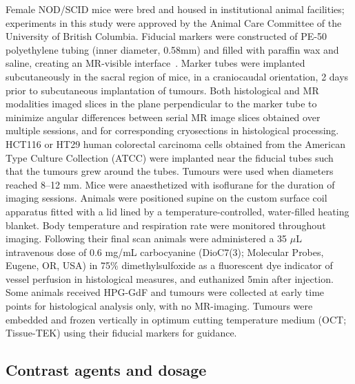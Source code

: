 Female NOD/SCID mice were bred and housed in institutional animal facilities; experiments in this study were approved by the Animal Care Committee of the University of British Columbia.
Fiducial markers were constructed of PE-50 polyethylene tubing (inner diameter, 0.58mm) and filled with paraffin wax and saline, creating an MR-visible interface~\cite{Bains:2009hh}.
Marker tubes were implanted subcutaneously in the sacral region of mice, in a craniocaudal orientation, 2 days prior to subcutaneous implantation of tumours.
Both histological and MR modalities imaged slices in the plane perpendicular to the marker tube to minimize angular differences between serial MR image slices obtained over multiple sessions, and for corresponding cryosections in histological processing.
HCT116 or HT29 human colorectal carcinoma cells obtained from the American Type Culture Collection (ATCC) were implanted near the fiducial tubes such that the tumours grew around the tubes.
Tumours were used when diameters reached 8–12 mm.
Mice were anaesthetized with isoflurane for the duration of imaging sessions.
Animals were positioned supine on the custom surface coil apparatus fitted with a lid lined by a temperature-controlled, water-filled heating blanket.
Body temperature and respiration rate were monitored throughout imaging.
Following their final scan animals were administered a 35 $\mu$L intravenous dose of 0.6 mg/mL carbocyanine (DioC7(3); Molecular Probes, Eugene, OR, USA) in 75\% dimethylsulfoxide as a fluorescent dye indicator of vessel perfusion in histological measures, and euthanized 5min after injection.
Some animals received HPG-GdF and tumours were collected at early time points for histological analysis only, with no MR-imaging.
Tumours were embedded and frozen vertically in optimum cutting temperature medium (OCT; Tissue-TEK) using their fiducial markers for guidance.

\subsection{Contrast agents and dosage}

